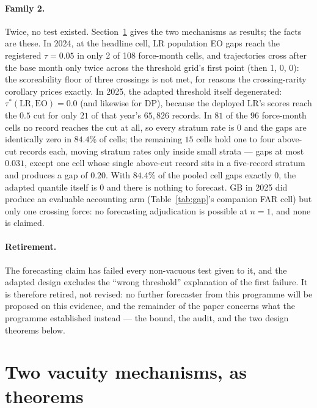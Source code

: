 \documentclass[11pt]{article}
\begin{document}
\paragraph{Family 2.} Twice, no test existed.
Section~\ref{sec:vacuity} gives the two mechanisms as results; the
facts are these. In 2024, at the headline cell, LR population EO
gaps reach the registered $\tau = 0.05$ in only 2 of 108 force-month
cells, and trajectories cross after the base month only twice
across the threshold grid's first point (then 1, 0, 0): the
scoreability floor of three crossings is not met, for reasons the
crossing-rarity corollary prices exactly. In 2025, the adapted
threshold itself degenerated: $\tau^*(\mathrm{LR}, \mathrm{EO}) =
0.0$ (and likewise for DP), because the deployed LR's scores reach the $0.5$ cut for only $21$ of that year's $65{,}826$ records. In $81$ of the $96$ force-month cells no record reaches the cut at all, so every stratum rate is $0$ and the gaps are identically zero in $84.4\%$ of cells; the remaining $15$ cells hold one to four above-cut records each, moving stratum rates only inside small strata --- gaps at most $0.031$, except one cell whose single above-cut record sits in a five-record stratum and produces a gap of $0.20$. With $84.4\%$ of the pooled cell gaps exactly $0$, the adapted quantile itself is $0$ and there is nothing to forecast. GB in 2025 did produce an evaluable accounting
arm (Table~\ref{tab:gap}'s companion FAR cell) but only one
crossing force: no forecasting adjudication is possible at $n = 1$,
and none is claimed.

\paragraph{Retirement.} The forecasting claim has failed every
non-vacuous test given to it, and the adapted design excludes the
``wrong threshold'' explanation of the first failure. It is
therefore retired, not revised: no further forecaster from this
programme will be proposed on this evidence, and the remainder of
the paper concerns what the programme established instead --- the
bound, the audit, and the two design theorems below.

\section{Two vacuity mechanisms, as theorems}
\label{sec:vacuity}
\end{document}
